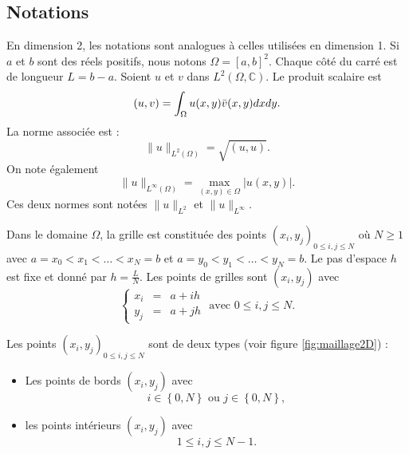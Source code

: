 \subsection{Notations}
\label{sec:notation_2D}

En dimension 2, les notations sont analogues à celles utilisées en dimension 1. Si $a$ et $b$ sont des réels positifs, nous notons $\Omega = [a,b]^2$. Chaque côté du carré est de longueur $L=b-a$. Soient $u$ et $v$ dans $L^2(\Omega, \mathbb{C})$. Le produit scalaire est
\begin{equation}
(u,v) = \displaystyle\int_{\Omega} u(x,y) \bar{v}(x,y) dx dy.
\end{equation}
La norme associée est :
\begin{equation}
\| u \|_{L^2(\Omega)} = \sqrt{(u,u)}. 
\end{equation}
On note également
\begin{equation}
\| u \|_{L^{\infty} ( \Omega )} = \max_{(x,y) \in \Omega} |u(x,y)|.
\end{equation}
Ces deux normes sont notées $\| u \|_{L^2}$ et $\| u \|_{L^{\infty}}$.

Dans le domaine $\Omega$, la grille est constituée des points $(x_i,y_j)_{0 \leq i,j \leq N}$ où $N \geq 1$ avec $a = x_0 < x_1 < \ldots < x_N = b$ et $a = y_0 < y_1 < \ldots < y_N = b$. Le pas d'espace $h$ est fixe et donné par $h = \frac{L}{N}$. Les points de grilles sont $(x_i, y_j)$ avec 
\begin{equation}
\left\lbrace\begin{array}{rcl}
x_i & = & a + i h \\
y_j & = & a + j h 
\end{array}\right. \text{ avec } 0 \leq i,j \leq N.
\end{equation}

Les points $(x_i,y_j)_{0 \leq i,j \leq N}$ sont de deux types (voir figure \ref{fig:maillage2D}) :
\begin{itemize}
\item Les points de bords $(x_i, y_j)$ avec
\begin{equation}
i \in \left\lbrace 0 , N \right\rbrace \text{ ou } j \in \left\lbrace 0 , N \right\rbrace,
\end{equation}
\item les points intérieurs $(x_i, y_j)$ avec
\begin{equation}
1 \leq i,j \leq N-1.
\end{equation}
\end{itemize}



